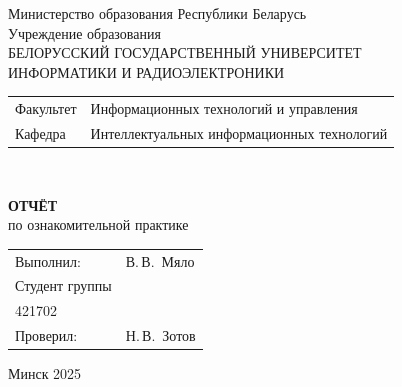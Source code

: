 \begin{titlepage}
  \begin{center}
    Министерство образования Республики Беларусь\\[1em]
    Учреждение образования\\
    БЕЛОРУССКИЙ ГОСУДАРСТВЕННЫЙ УНИВЕРСИТЕТ \\
    ИНФОРМАТИКИ И РАДИОЭЛЕКТРОНИКИ\\[1em]

    \begin{minipage}{\textwidth}
      \begin{flushleft}
        \begin{tabular}{ l l }
          Факультет & Информационных технологий и управления\\
          Кафедра   & Интеллектуальных информационных технологий
        \end{tabular}
      \end{flushleft}
    \end{minipage}\\[1em]

    \vspace{5em}


    \textbf{ОТЧЁТ}\\
    
    {по ознакомительной практике}\\
    \vspace{10em}
    
    \begin{tabular}{ p{}p{} }
      Выполнил:& В.\,В.~Мяло \\[1em]
      Студент группы& \\
      421702 & \\
      Проверил: & Н.\,В.~Зотов \\

     
    \end{tabular}
    
    \vfill
    {\normalsize Минск 2025}
  \end{center}
\end{titlepage}
